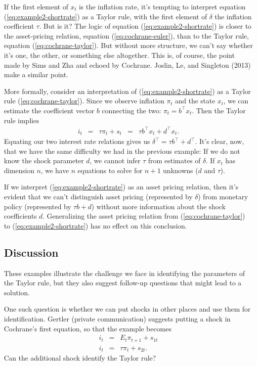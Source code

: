 \documentclass[11pt]{article}
\begin{document}
{If the first element of $x_t$ is the inflation rate,
it's tempting to interpret equation (\ref{eq:example2-shortrate}) as a Taylor rule,
with the first element of $\delta$ the inflation coefficient $\tau$.
But is it?
The logic of equation (\ref{eq:example2-shortrate})
is closer to the asset-pricing relation, equation (\ref{eq:cochrane-euler}),
than to the Taylor rule, equation (\ref{eq:cochrane-taylor}).
But without more structure, we can't say whether it's one, the other,
or something else altogether.
This is, of course, the point made by Sims and Zha
and echoed by Cochrane.
Joslin, Le, and Singleton (2013) make a similar point.

More formally, consider an interpretation
of (\ref{eq:example2-shortrate}) as a Taylor rule (\ref{eq:cochrane-taylor}).
Since we observe inflation $\pi_t$ and the state $x_t$,
we can estimate the coefficient vector $b$ connecting the two:  $\pi_t = b^\top x_t$.
Then the Taylor rule implies
\begin{eqnarray*}
    i_t &=& \tau \pi_t + s_t
        \;\;=\;\; \tau b^\top x_t + d^\top x_t .
\end{eqnarray*}
Equating our two interest rate relations gives us
$\delta^\top = \tau b^\top + d^\top$.
It's clear, now, that we have the same difficulty we had in the previous example:
If we do not know the shock parameter $d$,
we cannot infer $\tau$ from estimates of $\delta$.
If $x_t$ has dimension $n$, we have $n$ equations to solve for
$n+1$ unknowns ($d$ and $\tau$).

If we interpret (\ref{eq:example2-shortrate}) as an asset pricing relation,
then it's evident that we can't distinguish asset pricing (represented by $\delta$)
from monetary policy (represented by $\tau b + d $) without more information
about the shock coefficients $d$.
Generalizing the asset pricing relation from (\ref{eq:cochrane-taylor})
to (\ref{eq:example2-shortrate}) has no effect on this conclusion.


\subsection{Discussion}
\label{sec:examples-discussion}

These examples illustrate the challenge we face in identifying the parameters
of the Taylor rule,
but they also suggest follow-up questions that might lead to a solution.

One such question is whether we can put shocks in other places
and use them for identification.
Gertler (private communication) suggests putting a shock
in Cochrane's first equation, so that the example becomes
\begin{eqnarray*}
    i_t &=& E_t \pi_{t+1} + s_{1t} \\
    i_t &=& \tau \pi_t + s_{2t} .
\end{eqnarray*}
Can the additional shock identify the Taylor rule?

}
\end{document}
